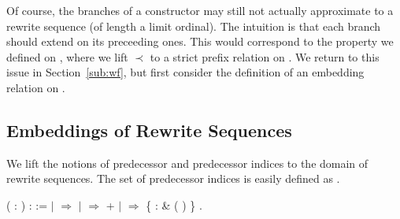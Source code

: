 Of course, the branches of a 
constructor may still not actually approximate to a rewrite sequence (of
length a limit ordinal). The intuition is that each branch should extend on
its preceeding ones. This would correspond to the
 property we defined on
, where we lift $\prec$ to a
strict prefix relation on
.
We return to this issue in Section~\ref{sub:wf}, but
first consider the definition of an embedding relation on
.


\subsection{Embeddings of Rewrite Sequences}

We lift the notions of predecessor and predecessor indices to the domain of
rewrite sequences. The set of predecessor indices is easily defined as
.
\begin{singlespace}
\begin{coqdoccode}
\coqdocnoindent
{}
 
(\coqdocvar{$\varphi$} : 
 ) :
 :=\coqdoceol
\coqdocindent{1.00em}
 \coqdocvariable{$\varphi$} \coqdoceol
\coqdocindent{1.00em}
\ensuremath{|}  \coqdocvar{\_}
\ensuremath{\Rightarrow}
\coqdoceol
\coqdocindent{1.00em}
\ensuremath{|} 
\coqdocvar{\_} \coqdocvar{\_} \coqdocvar{\_} \coqdocvar{$\psi$} \coqdocvar{\_}
\ensuremath{\Rightarrow}
+ 
\coqdocvariable{$\psi$}\coqdoceol
\coqdocindent{1.00em}
\ensuremath{|}  \coqdocvar{\_}
\coqdocvar{\_} \coqdocvar{\_}  \coqdocvar{\_}
\ensuremath{\Rightarrow} \{  :
\& 
( ) \}\coqdoceol
\coqdocindent{1.00em}
.\coqdoceol
\end{coqdoccode}
\end{singlespace}

